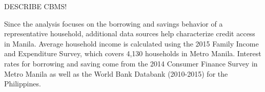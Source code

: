 \documentclass[12pt]{article}
\begin{document}
DESCRIBE CBMS!

Since the analysis focuses on the borrowing and savings behavior of a representative household, additional data sources help characterize credit access in Manila.  Average household income is calculated using the  2015 Family Income and Expenditure Survey, which covers 4,130 households in Metro Manila.  Interest rates for borrowing and saving come from the 2014 Consumer Finance Survey in Metro Manila as well as the World Bank Databank (2010-2015) for the Philippines.  





\end{document}

